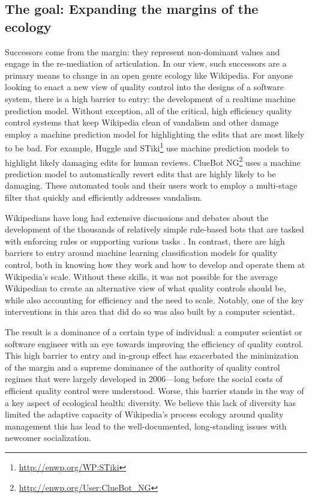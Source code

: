 \subsection{The goal: Expanding the margins of the ecology}
Successors come from the margin: they represent non-dominant values and engage in the re-mediation of articulation\cite{mugar2017preserving}.  In our view, such successors are a primary means to change in an open genre ecology like Wikipedia.  For anyone looking to enact a new view of quality control into the designs of a software system, there is a high barrier to entry: the development of a realtime machine prediction model.  Without exception, all of the critical, high efficiency quality control systems that keep Wikipedia clean of vandalism and other damage employ a machine prediction model for highlighting the edits that are most likely to be bad. For example, Huggle and STiki\footnote{\url{http://enwp.org/WP:STiki}} use machine prediction models to highlight likely damaging edits for human reviews.  ClueBot NG\footnote{\url{http://enwp.org/User:ClueBot_NG}} uses a machine prediction model to automatically revert edits that are highly likely to be damaging.  These automated tools and their users work to employ a multi-stage filter that quickly and efficiently addresses vandalism\cite{geiger2013levee}.

Wikipedians have long had extensive discussions and debates about the development of the thousands of relatively simple rule-based bots that are tasked with enforcing rules or supporting various tasks \cite{geiger2011lives}. In contrast, there are high barriers to entry around machine learning classification models for quality control, both in knowing how they work and how to develop and operate them at Wikipedia's scale.  Without these skills, it was not possible for the average Wikipedian to create an alternative view of what quality controls should be, while also accounting for efficiency and the need to scale.  Notably, one of the key interventions in this area that did do so was also built by a computer scientist\cite{halfaker2014snuggle}.

The result is a dominance of a certain type of individual: a computer scientist or software engineer with an eye towards improving the efficiency of quality control.  This high barrier to entry and in-group effect has exacerbated the minimization of the margin and a supreme dominance of the authority of quality control regimes that were largely developed in 2006---long before the social costs of efficient quality control were understood.  Worse, this barrier stands in the way of a key aspect of ecological health: diversity.  We believe this lack of diversity has limited the adaptive capacity of Wikipedia's process ecology around quality management this has lead to the well-documented, long-standing issues with newcomer socialization\cite{halfaker2013rise}.

